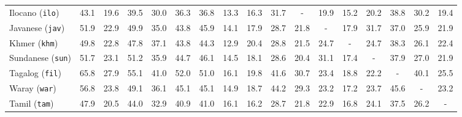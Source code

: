\begin{table}[ht]
{\begin{tabular}{l *{16}{c}}
Ilocano (\texttt{ilo}) & 43.1 & 19.6 & 39.5 & 30.0 & 36.3 & 36.8 & 13.3 & 16.3 & 31.7 & - & 19.9 & 15.2 & 20.2 & 38.8 & 30.2 & 19.4 \\ %
Javanese (\texttt{jav}) & 51.9 & 22.9 & 49.9 & 35.0 & 43.8 & 45.9 & 14.1 & 17.9 & 28.7 & 21.8 & - & 17.9 & 31.7 & 37.0 & 25.9 & 21.9 \\ %
Khmer (\texttt{khm}) & 49.8 & 22.8 & 47.8 & 37.1 & 43.8 & 44.3 & 12.9 & 20.4 & 28.8 & 21.5 & 24.7 & - & 24.7 & 38.3 & 26.1 & 22.4 \\ %
Sundanese (\texttt{sun}) & 51.7 & 23.1 & 51.2 & 35.9 & 44.7 & 46.1 & 14.5 & 18.1 & 28.6 & 20.4 & 31.1 & 17.4 & - & 37.9 & 27.0 & 21.9 \\ %
Tagalog (\texttt{fil}) & 65.8 & 27.9 & 55.1 & 41.0 & 52.0 & 51.0 & 16.1 & 19.8 & 41.6 & 30.7 & 23.4 & 18.8 & 22.2 & - & 40.1 & 25.5 \\ %
Waray (\texttt{war}) & 56.8 & 23.8 & 49.1 & 36.1 & 45.1 & 45.1 & 14.9 & 18.7 & 44.2 & 29.3 & 23.2 & 17.2 & 23.7 & 45.6 & - & 23.2 \\ %
Tamil (\texttt{tam}) & 47.9 & 20.5 & 44.0 & 32.9 & 40.9 & 41.0 & 16.1 & 16.2 & 28.7 & 21.8 & 22.9 & 16.8 & 24.1 & 37.5 & 26.2 & - \\ %
\bottomrule
\end{tabular}
}
\end{table}